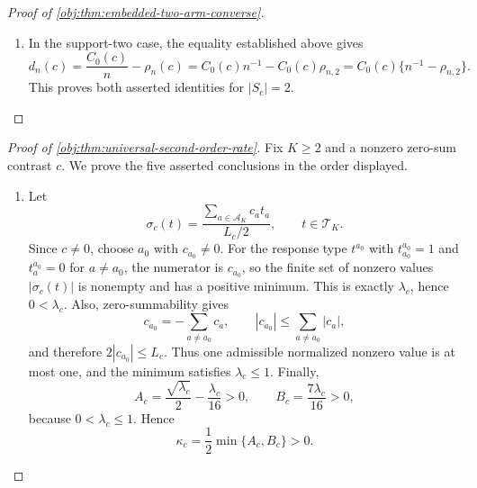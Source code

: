 \documentclass[11pt]{article}
\begin{document}
\begin{proof}[Proof of \cref{obj:thm:embedded-two-arm-converse}]
\begin{enumerate}
\item In the support-two case, the equality established above gives
\[
d_n(c)
=
\frac{C_0(c)}{n}-\rho_n(c)
=
C_0(c)n^{-1}-C_0(c)\rho_{n,2}
=
C_0(c)\{n^{-1}-\rho_{n,2}\}.
\]
This proves both asserted identities for \(|S_c|=2\).
\end{enumerate}
\end{proof}

\begin{proof}[Proof of \cref{obj:thm:universal-second-order-rate}]
Fix \(K\ge 2\) and a nonzero zero-sum contrast \(c\). We prove the five asserted conclusions in the order displayed.

\begin{enumerate}
\item Let
\[
\sigma_c(t)=\frac{\sum_{a\in\mathcal A_K}c_a t_a}{L_c/2},
\qquad t\in\mathcal T_K .
\]
Since \(c\neq 0\), choose \(a_0\) with \(c_{a_0}\neq 0\). For the response type \(t^{a_0}\) with \(t^{a_0}_{a_0}=1\) and \(t^{a_0}_a=0\) for \(a\neq a_0\), the numerator is \(c_{a_0}\), so the finite set of nonzero values \(|\sigma_c(t)|\) is nonempty and has a positive minimum. This is exactly \(\lambda_c\), hence \(0<\lambda_c\). Also, zero-summability gives
\[
c_{a_0}=-\sum_{a\neq a_0}c_a,
\qquad
|c_{a_0}|\le \sum_{a\neq a_0}|c_a|,
\]
and therefore \(2|c_{a_0}|\le L_c\). Thus one admissible normalized nonzero value is at most one, and the minimum satisfies \(\lambda_c\le 1\). Finally,
\[
A_c=\frac{\sqrt{\lambda_c}}2-\frac{\lambda_c}{16}>0,
\qquad
B_c=\frac{7\lambda_c}{16}>0,
\]
because \(0<\lambda_c\le 1\). Hence
\[
\kappa_c=\frac12\min\{A_c,B_c\}>0 .
\]


\end{enumerate}
\end{proof}
\end{document}
